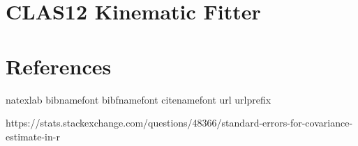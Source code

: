 \documentclass[showpacs,amsmath,amssymb,aps,prc,floatfix,showkeys,nofootinbib]{revtex4-1}
\begin{document}
\section{\label{kinFitter}CLAS12 Kinematic Fitter}





\section{References}
\begin{thebibliography}{21}
\expandafter\ifx\csname natexlab\endcsname\relax\def\natexlab#1{#1}\fi
\expandafter\ifx\csname bibnamefont\endcsname\relax
  \def\bibnamefont#1{#1}\fi
\expandafter\ifx\csname bibfnamefont\endcsname\relax
  \def\bibfnamefont#1{#1}\fi
\expandafter\ifx\csname citenamefont\endcsname\relax
  \def\citenamefont#1{#1}\fi
\expandafter\ifx\csname url\endcsname\relax
  \def\url#1{\texttt{#1}}\fi
\expandafter\ifx\csname urlprefix\endcsname\relax\def\urlprefix{URL }\fi
\providecommand{\bibinfo}[2]{#2}
\providecommand{\eprint}[2][]{\url{#2}}


  \bibinfo{journal}{https://stats.stackexchange.com/questions/48366/standard-errors-for-covariance-estimate-in-r} 

  
  \end{thebibliography}
\end{document}
